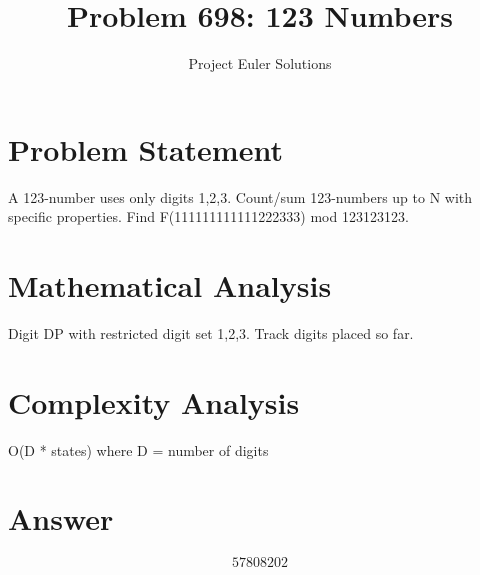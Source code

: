 \documentclass[11pt]{article}
\title{Problem 698: 123 Numbers}
\author{Project Euler Solutions}
\date{}
\begin{document}
\maketitle

\section{Problem Statement}

A 123-number uses only digits {1,2,3}. Count/sum 123-numbers up to N with specific properties. Find F(111111111111222333) mod 123123123.

\section{Mathematical Analysis}

Digit DP with restricted digit set {1,2,3}. Track digits placed so far.

\section{Complexity Analysis}

O(D * states) where D = number of digits

\section{Answer}

\[
\boxed{57808202}
\]
\end{document}
